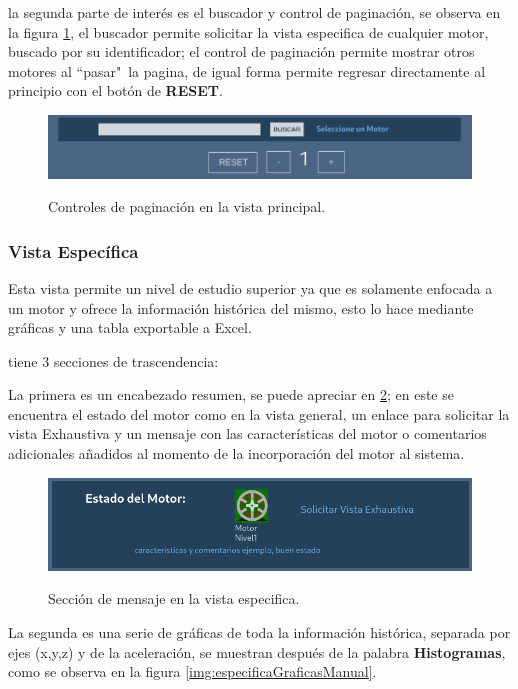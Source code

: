 \documentclass[12pt]{article}
\begin{document}
la segunda parte de interés es el buscador y control de paginación, se observa en
la figura \ref{img:buscadoreGeneral}, el buscador permite solicitar la vista
especifica de cualquier motor, buscado por su identificador;
el control de paginación permite mostrar otros motores al ``pasar"\ la pagina,
de igual forma permite regresar directamente al principio con el botón de
\textbf{RESET}.

    \begin{figure}[H]
		\centering
        \caption{Controles de paginación en la vista principal. }
        \includegraphics[width=\linewidth]{ManualUsuario/controles.png}
        \label{img:buscadoreGeneral}
	\end{figure}


\subsubsection{Vista Específica}
Esta vista permite un nivel de estudio superior ya que es solamente enfocada
a un motor y ofrece la información histórica del mismo, esto lo hace mediante
gráficas y una tabla exportable a Excel.

tiene 3 secciones de trascendencia:

La primera es un encabezado resumen,
se puede apreciar en \ref{img:especificaHeaderManual}; en este se encuentra
el estado del motor como en la vista general, un enlace para solicitar la
vista Exhaustiva y un mensaje con las características del motor o
comentarios adicionales añadidos al momento de la incorporación del motor al
sistema.

    \begin{figure}[H]
		\centering
        \caption{Sección de mensaje en la vista especifica. }
        \includegraphics[width=\linewidth]{ManualUsuario/especificaMensaje.png}
        \label{img:especificaHeaderManual}
	\end{figure}

La segunda es una serie de gráficas de toda la información histórica, separada
por ejes (x,y,z) y de la aceleración, se muestran después de la palabra
\textbf{Histogramas}, como se observa en la figura \ref{img:especificaGraficasManual}.
\end{document}
